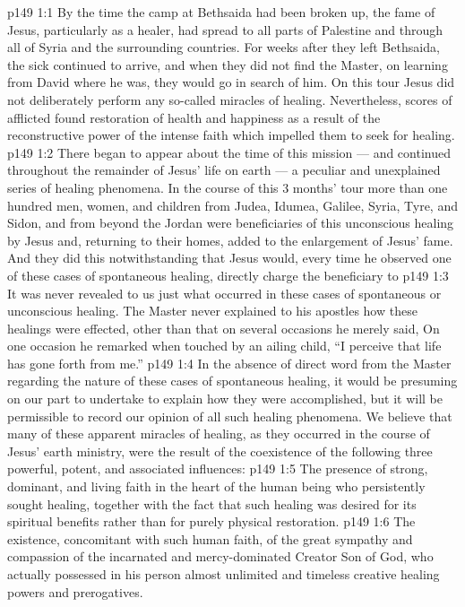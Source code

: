 \vs p149 1:1 By the time the camp at Bethsaida had been broken up, the fame of Jesus, particularly as a healer, had spread to all parts of Palestine and through all of Syria and the surrounding countries. For weeks after they left Bethsaida, the sick continued to arrive, and when they did not find the Master, on learning from David where he was, they would go in search of him. On this tour Jesus did not deliberately perform any so\hyp{}called miracles of healing. Nevertheless, scores of afflicted found restoration of health and happiness as a result of the reconstructive power of the intense faith which impelled them to seek for healing.
\vs p149 1:2 There began to appear about the time of this mission --- and continued throughout the remainder of Jesus’ life on earth --- a peculiar and unexplained series of healing phenomena. In the course of this 3 months’ tour more than one hundred men, women, and children from Judea, Idumea, Galilee, Syria, Tyre, and Sidon, and from beyond the Jordan were beneficiaries of this unconscious healing by Jesus and, returning to their homes, added to the enlargement of Jesus’ fame. And they did this notwithstanding that Jesus would, every time he observed one of these cases of spontaneous healing, directly charge the beneficiary to 
\vs p149 1:3 \pc It was never revealed to us just what occurred in these cases of spontaneous or unconscious healing. The Master never explained to his apostles how these healings were effected, other than that on several occasions he merely said,  On one occasion he remarked when touched by an ailing child, “I perceive that life has gone forth from me.”
\vs p149 1:4 In the absence of direct word from the Master regarding the nature of these cases of spontaneous healing, it would be presuming on our part to undertake to explain how they were accomplished, but it will be permissible to record our opinion of all such healing phenomena. We believe that many of these apparent miracles of healing, as they occurred in the course of Jesus’ earth ministry, were the result of the coexistence of the following three powerful, potent, and associated influences:
\vs p149 1:5 \bibnobreakspace The presence of strong, dominant, and living faith in the heart of the human being who persistently sought healing, together with the fact that such healing was desired for its spiritual benefits rather than for purely physical restoration.
\vs p149 1:6 \bibnobreakspace The existence, concomitant with such human faith, of the great sympathy and compassion of the incarnated and mercy\hyp{}dominated Creator Son of God, who actually possessed in his person almost unlimited and timeless creative healing powers and prerogatives.
